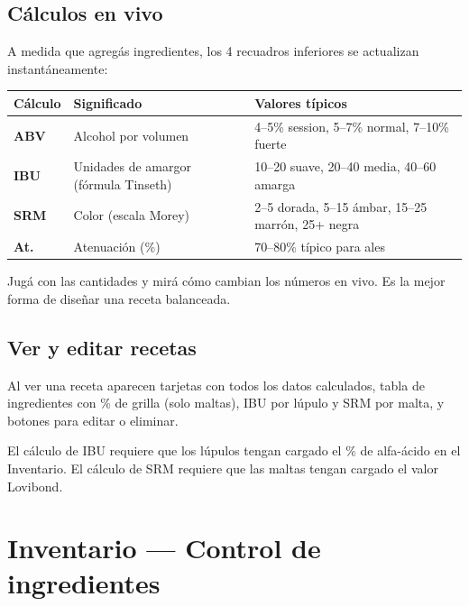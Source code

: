 \documentclass[11pt,a4paper]{report}
\begin{document}
\section{Cálculos en vivo}

A medida que agregás ingredientes, los 4 recuadros inferiores se actualizan instantáneamente:

\begin{center}
\begin{tabular}{>{\bfseries}lll}
\toprule
\rmfamily\bfseries Cálculo & \rmfamily\bfseries Significado & \rmfamily\bfseries Valores típicos \\
\midrule
ABV   & Alcohol por volumen                      & 4--5\% session, 5--7\% normal, 7--10\% fuerte \\
IBU   & Unidades de amargor (fórmula Tinseth)    & 10--20 suave, 20--40 media, 40--60 amarga \\
SRM   & Color (escala Morey)                     & 2--5 dorada, 5--15 ámbar, 15--25 marrón, 25+ negra \\
At.   & Atenuación (\%)                           & 70--80\% típico para ales \\
\bottomrule
\end{tabular}
\end{center}

\begin{tipbox}
Jugá con las cantidades y mirá cómo cambian los números en vivo. Es la mejor forma de diseñar una receta balanceada.
\end{tipbox}

\section{Ver y editar recetas}

Al ver una receta aparecen tarjetas con todos los datos calculados, tabla de ingredientes con \% de grilla (solo maltas), IBU por lúpulo y SRM por malta, y botones para editar o eliminar.

\begin{warnbox}
El cálculo de IBU requiere que los lúpulos tengan cargado el \% de alfa-ácido en el Inventario. El cálculo de SRM requiere que las maltas tengan cargado el valor Lovibond.
\end{warnbox}

\chapter{Inventario — Control de ingredientes}
\end{document}
